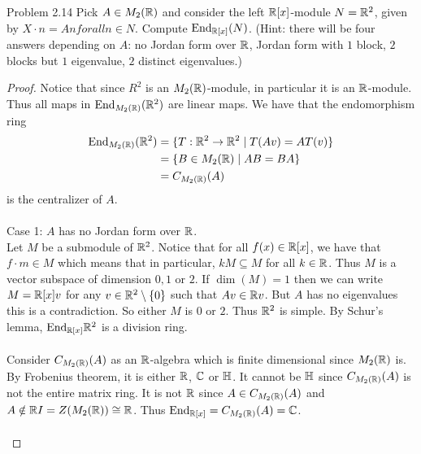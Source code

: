 \documentclass[a4paper]{article}
\begin{document}
\begin{ex}{Problem 2.14}{} Pick $A\in M_2(\mathbb{R})$ and consider the left $\mathbb{R}[x]$-module $N=\mathbb{R}^2$, given by $X\cdot n=An for all n\in N$. Compute $\text{End}_{\mathbb{R}[x]}(N)$. (Hint: there will be four answers depending on $A$: no Jordan form over $\mathbb{R}$, Jordan form with $1$ block, $2$ blocks but $1$ eigenvalue, $2$ distinct eigenvalues.) \tcbline
\begin{proof}
Notice that since $R^2$ is an $M_2(\mathbb{R})$-module, in particular it is an $\mathbb{R}$-module. Thus all maps in $\text{End}_{M_2(\mathbb{R})}(\mathbb{R}^2)$ are linear maps. We have that the endomorphism ring
\begin{align*}
\text{End}_{M_2(\mathbb{R})}(\mathbb{R}^2)&=\{T:\mathbb{R}^2\to\mathbb{R}^2\;|\;T(Av)=AT(v)\}\\
&=\{B\in M_2(\mathbb{R})\;|\;AB=BA\}\\
&=C_{M_2(\mathbb{R})}(A)
\end{align*}
is the centralizer of $A$. \\~\\

Case 1: $A$ has no Jordan form over $\mathbb{R}$. \\
Let $M$ be a submodule of $\mathbb{R}^2$. Notice that for all $f(x)\in\mathbb{R}[x]$, we have that $f\cdot m\in M$ which means that in particular, $kM\subseteq M$ for all $k\in\mathbb{R}$. Thus $M$ is a vector subspace of dimension $0,1$ or $2$. If $\dim(M)=1$ then we can write $M=\mathbb{R}[x]v$ for any $v\in\mathbb{R}^2\setminus\{0\}$ such that $Av\in\mathbb{R} v$. But $A$ has no eigenvalues this is a contradiction. So either $M$ is $0$ or $2$. Thus $\mathbb{R}^2$ is simple. By Schur's lemma, $\text{End}_{\mathbb{R}[x]}\mathbb{R}^2$ is a division ring. \\~\\

Consider $C_{M_2(\mathbb{R})}(A)$ as an $\mathbb{R}$-algebra which is finite dimensional since $M_2(\mathbb{R})$ is. By Frobenius theorem, it is either $\mathbb{R}$, $\mathbb{C}$ or $\mathbb{H}$. It cannot be $\mathbb{H}$ since $C_{M_2(\mathbb{R})}(A)$ is not the entire matrix ring. It is not $\mathbb{R}$ since $A\in C_{M_2(\mathbb{R})}(A)$ and $A\notin\mathbb{R} I=Z(M_2(\mathbb{R}))\cong\mathbb{R}$. Thus $\text{End}_{\mathbb{R}[x]}=C_{M_2(\mathbb{R})}(A)=\mathbb{C}$. \\~\\


\end{proof}
\end{ex}
\end{document}
